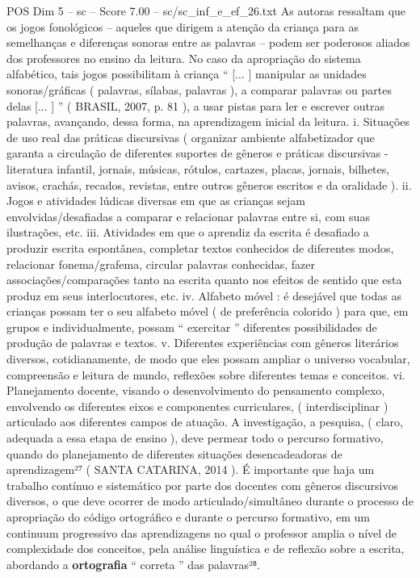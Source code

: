 \begin{textsample}{POS Dim 5 – sc – Score 7.00 – sc/sc\_inf\_e\_ef\_26.txt}
As autoras ressaltam que os jogos fonológicos – aqueles que dirigem a atenção da criança para as semelhanças e diferenças sonoras entre as palavras – podem ser poderosos aliados dos professores no ensino da leitura.
No caso da apropriação do sistema alfabético, tais jogos possibilitam à criança “ [... ] manipular as unidades sonoras/gráficas ( palavras, sílabas, palavras ), a comparar palavras ou partes delas [... ] ” ( BRASIL, 2007, p. 81 ), a usar pistas para ler e escrever outras palavras, avançando, dessa forma, na aprendizagem inicial da leitura. i.
Situações de uso real das práticas discursivas ( organizar ambiente alfabetizador que garanta a circulação de diferentes suportes de gêneros e práticas discursivas - literatura infantil, jornais, músicas, rótulos, cartazes, placas, jornais, bilhetes, avisos, crachás, recados, revistas, entre outros gêneros escritos e da oralidade ). ii.
Jogos e atividades lúdicas diversas em que as crianças sejam envolvidas/desafiadas a comparar e relacionar palavras entre si, com suas ilustrações, etc. iii.
Atividades em que o aprendiz da escrita é desafiado a produzir escrita espontânea, completar textos conhecidos de diferentes modos, relacionar fonema/grafema, circular palavras conhecidas, fazer associações/comparações tanto na escrita quanto nos efeitos de sentido que esta produz em seus interlocutores, etc. iv.
Alfabeto móvel : é desejável que todas as crianças possam ter o seu alfabeto móvel ( de preferência colorido ) para que, em grupos e individualmente, possam “ exercitar ” diferentes possibilidades de produção de palavras e textos. v.
Diferentes experiências com gêneros literários diversos, cotidianamente, de modo que eles possam ampliar o universo vocabular, compreensão e leitura de mundo, reflexões sobre diferentes temas e conceitos. vi.
Planejamento docente, visando o desenvolvimento do pensamento complexo, envolvendo os diferentes eixos e componentes curriculares, ( interdisciplinar ) articulado aos diferentes campos de atuação.
A investigação, a pesquisa, ( claro, adequada a essa etapa de ensino ), deve permear todo o percurso formativo, quando do planejamento de diferentes situações desencadeadoras de aprendizagem²⁷ ( SANTA CATARINA, 2014 ).
É importante que haja um trabalho contínuo e sistemático por parte dos docentes com gêneros discursivos diversos, o que deve ocorrer de modo articulado/simultâneo durante o processo de apropriação do código ortográfico e durante o percurso formativo, em um continuum progressivo das aprendizagens no qual o professor amplia o nível de complexidade dos conceitos, pela análise linguística e de reflexão sobre a escrita, abordando a \textbf{ortografia} “ correta ” das palavras²⁸.

\end{textsample}
